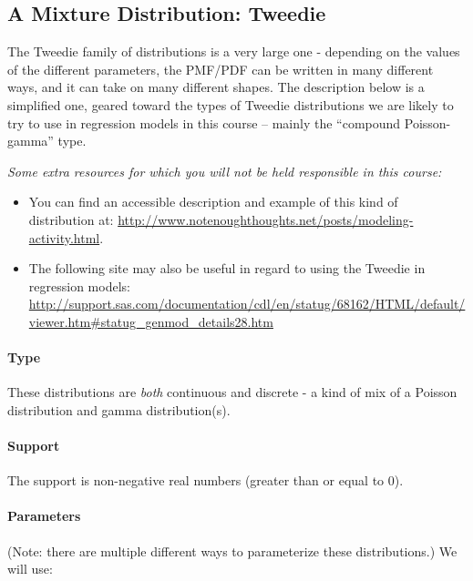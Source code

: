 \documentclass[]{book}
\let\oldparagraph\paragraph
\renewcommand{\paragraph}[1]{\oldparagraph{#1}\mbox{}}
\begin{document}
\hypertarget{a-mixture-distribution-tweedie}{%
\subsection{A Mixture Distribution: Tweedie}\label{a-mixture-distribution-tweedie}}

The Tweedie family of distributions is a very large one - depending on the values of the different parameters, the PMF/PDF can be written in many different ways, and it can take on many different shapes. The description below is a simplified one, geared toward the types of Tweedie distributions we are likely to try to use in regression models in this course -- mainly the ``compound Poisson-gamma'' type.

\emph{Some extra resources for which you will not be held responsible in this course:}

\begin{itemize}
\item
  You can find an accessible description and example of this kind of distribution at: \url{http://www.notenoughthoughts.net/posts/modeling-activity.html}.
\item
  The following site may also be useful in regard to using the Tweedie in regression models: \url{http://support.sas.com/documentation/cdl/en/statug/68162/HTML/default/viewer.htm\#statug_genmod_details28.htm}
\end{itemize}

\hypertarget{type-6}{%
\paragraph{Type}\label{type-6}}

These distributions are \emph{both} continuous and discrete - a kind of mix of a Poisson distribution and gamma distribution(s).

\hypertarget{support-6}{%
\paragraph{Support}\label{support-6}}

The support is non-negative real numbers (greater than or equal to 0).

\hypertarget{parameters-6}{%
\paragraph{Parameters}\label{parameters-6}}

(Note: there are multiple different ways to parameterize these distributions.) We will use:
\end{document}
